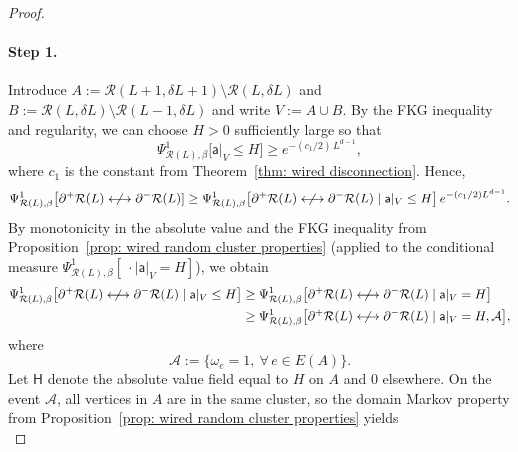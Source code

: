 \documentclass[11pt,a4paper]{article}
\numberwithin{equation}{section}
\theoremstyle{plain}
\theoremstyle{definition}
\begin{document}
\begin{proof}
\paragraph{Step 1.}
Introduce
$A := \mathcal{R}(L+1,\delta L+1)\setminus \mathcal{R}(L,\delta L)$ and $B:=\mathcal{R}(L,\delta L)\setminus \mathcal{R}(L-1,\delta L)$ and write $V:=A\cup B$.
By the FKG inequality and regularity, we can choose $H>0$ sufficiently large so that
\begin{equation}
\Psi^1_{\mathcal{R}(L),\beta}\big[\mathsf{a}|_V\leq H \big]\geq e^{-(c_1/2) \, L^{d-1}},
\end{equation}
where $c_1$ is the constant from Theorem~\ref{thm: wired disconnection}. Hence,
\begin{equation}\label{eq: proof lemma T1}
\Psi^1_{\mathcal{R}(L),\beta} \big[\partial^+\mathcal{R}(L)\centernot\longleftrightarrow\partial^-\mathcal{R}(L)]
\geq 
\Psi^1_{\mathcal{R}(L),\beta} \big[\partial^+\mathcal{R}(L)\centernot\longleftrightarrow\partial^-\mathcal{R}(L) \mid \mathsf{a}|_V\leq H \big]\,
e^{-(c_1/2) L^{d-1}}.
\end{equation}
By monotonicity in the absolute value and the FKG inequality from Proposition~\ref{prop: wired random cluster properties} (applied to the conditional measure $\Psi^1_{\mathcal R(L), \beta}[\ \cdot \mid \mathsf a|_V = H]$), we obtain
\begin{equation}
\begin{aligned}
\Psi^1_{\mathcal{R}(L),\beta} \big[\partial^+\mathcal{R}(L)\centernot\longleftrightarrow\partial^-\mathcal{R}(L) \mid \mathsf{a}|_V\leq H \big]
&\geq 
\Psi^1_{\mathcal{R}(L),\beta} \big[\partial^+\mathcal{R}(L)\centernot\longleftrightarrow\partial^-\mathcal{R}(L) \mid \mathsf{a}|_V=H \big] \\
&\geq 
\Psi^1_{\mathcal{R}(L),\beta} \big[\partial^+\mathcal{R}(L)\centernot\longleftrightarrow\partial^-\mathcal{R}(L) \mid \mathsf a|_V=H, \mathcal{A} \big],
\end{aligned}
\end{equation}
where
\begin{equation}
\mathcal A := \{\omega_e = 1,\ \forall \, e \in E(A)\}.
\end{equation}
Let $\mathsf{H}$ denote the absolute value field equal to $H$ on
$A$ and $0$ elsewhere. 
On the event $\mathcal A$, all vertices in $A$ are in the same cluster, so the domain Markov property from Proposition~\ref{prop: wired random cluster properties} yields
\begin{equation}\label{eq: proof lemma T2}

\end{equation}
\end{proof}
\end{document}
